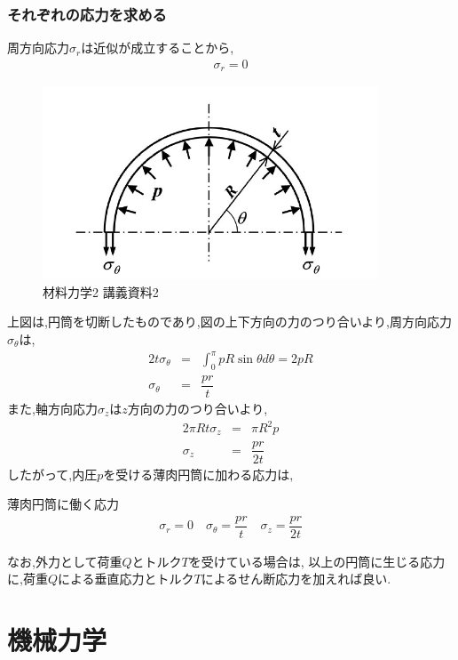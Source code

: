 \documentclass[a4paper]{jsarticle}
\begin{document}
\subsubsection{それぞれの応力を求める}
周方向応力$\sigma_r$は近似が成立することから,
\begin{eqnarray*}
    \sigma_r=0
\end{eqnarray*}
\begin{figure}[htbp]
    \begin{center}
        \includegraphics[width=100mm]{images/zairiki_image2.jpg}
        \caption{材料力学2 講義資料2}
    \end{center}
\end{figure}
上図は,円筒を切断したものであり,図の上下方向の力のつり合いより,周方向応力$\sigma_\theta$は,
\begin{eqnarray*}
    \displaystyle
    2t\sigma_\theta &=& \int^\pi_0 pR\sin\theta d\theta = 2pR\\
    \sigma_\theta &=&\dfrac{pr}{t}
\end{eqnarray*}
また,軸方向応力$\sigma_z$は$z$方向の力のつり合いより,
\begin{eqnarray*}
    2\pi Rt \sigma_z&=& \pi R^2p\\
    \sigma_z&=&\dfrac{pr}{2t}
\end{eqnarray*}
したがって,内圧$p$を受ける薄肉円筒に加わる応力は,
\begin{itembox}[l]{薄肉円筒に働く応力}
    \begin{eqnarray*}
        \sigma_r=0\quad
        \sigma_\theta =\dfrac{pr}{t}\quad
        \sigma_z=\dfrac{pr}{2t}
    \end{eqnarray*}
\end{itembox}
なお,外力として荷重$Q$とトルク$T$を受けている場合は,
以上の円筒に生じる応力に,荷重$Q$による垂直応力とトルク$T$によるせん断応力を加えれば良い.
\newpage
\section{機械力学}
\end{document}
